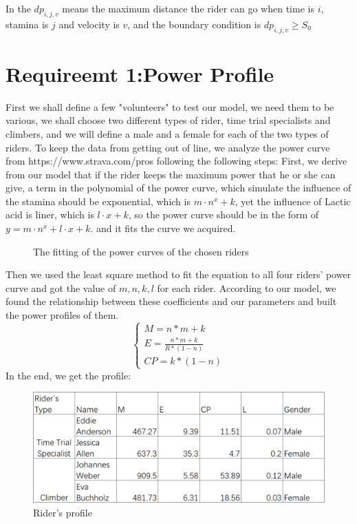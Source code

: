 \documentclass[12pt]{article}
\begin{document}
In the $dp_{i,j,v}$ means the maximum distance the rider can go when time is $i$, stamina is $j$ and velocity is $v$, and the boundary condition is $dp_{i,j,v}\geqslant S_0$
\section{Requireemt 1:Power Profile}
First we shall define a few "volunteers" to test our model, we need them to be various, we shall choose two different types of rider, time trial
specialists and climbers, and we will define a male and a female for each of the two types of riders. %
To keep the data from getting out of line, we analyze the power curve
from https://www.strava.com/pros following the following steps:
First, we derive from our model that if the rider keeps the maximum power that he or she can give, a term in the polynomial of the power curve,  which simulate the influence of the stamina should be exponential,
which is $m\cdot n^x+k$, yet the influence of Lactic acid is liner, which is $l\cdot x+k$, so the power curve should be in the form of $y=m\cdot n^x+l\cdot x+k$.
and it fits the curve we acquired.

\begin{figure}[H]
    \centering

    \caption{The fitting of the power curves of the chosen riders}
\end{figure}
Then we used the least square method to fit the equation to all four riders' power curve and  %
got the value of $m,n,k,l$ for each rider. According to our model, we found the relationship between these
coefficients and our parameters and built the power profiles of them.
\begin{equation}
    \left\{
    \begin{array}{c}
        M=n*m+k                 \\
        E=\frac{n*m+k}{R*(1-n)} \\
        CP=k*(1-n)
    \end{array}
    \right.
\end{equation}
In the end, we get the profile:
\begin{figure}
    \centering
    \includegraphics[width=1\columnwidth]{Rider's profile.jpg}
    \caption{Rider's profile}
\end{figure}
\end{document}
